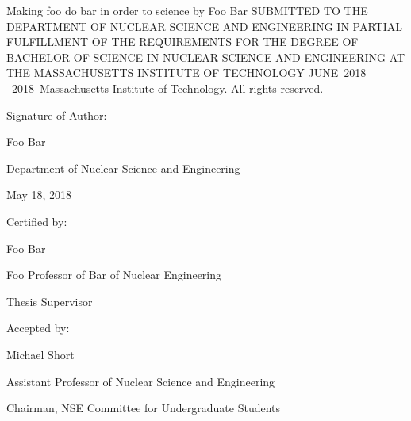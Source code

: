 \documentclass{article}
\newcommand{\thesis}{Making foo do bar in order to science}
\newcommand{\me}{Foo Bar}
\newcommand{\gradMonth}{JUNE}%
\newcommand{\gradYear}{2018}
\newcommand{\signDate}{May 18, 2018}
\newcommand{\advisorName}{Foo Bar}
\newcommand{\advisorTitle}{Foo Professor of Bar of Nuclear Engineering}
\newcommand{\ugChairName}{Michael Short}
\newcommand{\ugChairTitle}{Assistant Professor of Nuclear Science and Engineering}
\newcommand{\ugChairChair}{Chairman, NSE Committee for Undergraduate Students}
\newcommand{\copyStatement}{{\textcopyright \ \gradYear \ Massachusetts Institute of Technology. All rights reserved.}}
\begin{document}
\begin{titlepage}
    \begin{center}
    {\Large{\thesis}}
    \vfill
    {by}
    \vfill
    {\me}
    \vfill
    {SUBMITTED TO THE DEPARTMENT OF NUCLEAR SCIENCE AND ENGINEERING IN PARTIAL FULFILLMENT OF THE REQUIREMENTS FOR THE DEGREE OF}
    \vfill
    {BACHELOR OF SCIENCE IN NUCLEAR SCIENCE AND ENGINEERING}
    \vfill
    {AT THE}
    \vfill
    {MASSACHUSETTS INSTITUTE OF TECHNOLOGY}
    \vfill
    {\gradMonth\ \gradYear}
    \vfill
	\copyStatement
    \end{center}
    
    
    \begin{flushleft}
    {Signature of Author:\hrulefill}
    \end{flushleft}
    
    \begin{flushright}
    {\me }
    
    {Department of Nuclear Science and Engineering}
    
    {\signDate }
    \end{flushright}
    \vfill

    \begin{flushleft}
    {Certified by:\hrulefill}
    \end{flushleft}
    
    \begin{flushright}
    {\advisorName}
    
    {\advisorTitle}
    
    {Thesis Supervisor}
    
    \end{flushright}
    \vfill

\begin{flushleft}
    {Accepted by:\hrulefill}
    \end{flushleft}
    
    \begin{flushright}
	{\ugChairName}
	
	{\ugChairTitle}
	
	{\ugChairChair}
    \end{flushright}
    
\end{titlepage}
\end{document}
